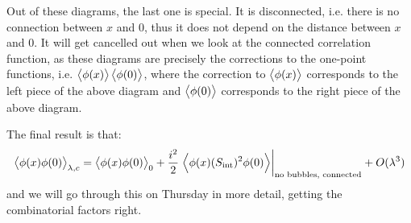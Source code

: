 Out of these diagrams, the last one is special. It is disconnected, i.e. there is no connection between $x$ and $0$, thus it does not depend on the distance between $x$ and $0$. It will get cancelled out when we look at the connected correlation function, as these diagrams are precisely the corrections to the one-point functions, i.e. $\left< \phi(x) \right>\left< \phi(0) \right>$, where the correction to $\left< \phi(x) \right>$ corresponds to the left piece of the above diagram and $\left< \phi(0) \right>$ corresponds to the right piece of the above diagram.

The final result is that:
\begin{equation}
    \left< \phi(x)\phi(0) \right>_{\lambda, c} = \left< \phi(x)\phi(0) \right>_0 + \frac{i^2}{2}\left.\left< \phi(x)(S_{\text{int}})^2\phi(0) \right>\right|_{\text{no bubbles, connected}} + O(\lambda^3)
\end{equation}
and we will go through this on Thursday in more detail, getting the combinatorial factors right.